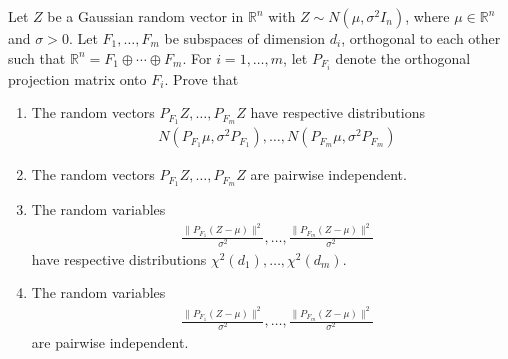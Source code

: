 \begin{exercise}
Let \(Z\) be a Gaussian random vector in \(\mathbb{R}^n\) with \(Z \sim N(\mu, \sigma^2 I_n)\), where \(\mu \in \mathbb{R}^n\) and \(\sigma > 0\). Let \(F_1, \ldots, F_m\) be subspaces of dimension \(d_i\), orthogonal to each other such that \(\mathbb{R}^n = F_1 \oplus \cdots \oplus F_m\). For \(i = 1, \ldots, m\), let \(P_{F_i}\) denote the orthogonal projection matrix onto \(F_i\). Prove that

\begin{enumerate}
    \item The random vectors \(P_{F_1}Z, \ldots, P_{F_m}Z\) have respective distributions
    \begin{align}
        &N(P_{F_1}\mu, \sigma^2 P_{F_1}), \ldots, N(P_{F_m}\mu, \sigma^2 P_{F_m})
    \end{align}

    \item The random vectors \(P_{F_1}Z, \ldots, P_{F_m}Z\) are pairwise independent.

    \item The random variables
    \begin{align}
        &\frac{\|P_{F_1}(Z-\mu)\|^2}{\sigma^2}, \ldots, \frac{\|P_{F_m}(Z-\mu)\|^2}{\sigma^2}
    \end{align}
    have respective distributions \(\chi^2(d_1), \ldots, \chi^2(d_m)\).

    \item The random variables 
    \begin{align}
        &\frac{\|P_{F_1}(Z-\mu)\|^2}{\sigma^2}, \ldots, \frac{\|P_{F_m}(Z-\mu)\|^2}{\sigma^2}
    \end{align}
    are pairwise independent.
\end{enumerate}
\end{exercise}


